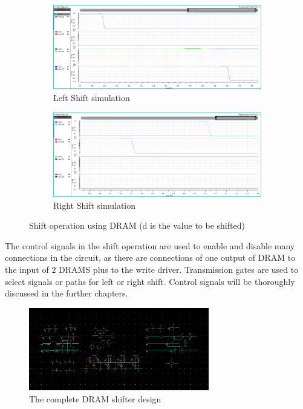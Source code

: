 \begin{figure}[H]
\begin{center}
\begin{subfigure}{0.7\textwidth}
\includegraphics[width=\textwidth]{shift_left_out.jpg}
\caption{Left Shift simulation}
\end{subfigure}
\begin{subfigure}{0.7\textwidth}
\includegraphics[width=\textwidth]{shift_out.jpg}
\caption{Right Shift simulation}
\end{subfigure}
\end{center}
\caption{Shift operation using DRAM (d is the value to be shifted)}

\end{figure}

The control signals in the shift operation are used to enable and disable many connections in the circuit, as there are connections of one output of DRAM to the input of 2 DRAMS plus to the write driver. Transmission gates are used to select signals or paths for left or right shift. Control signals will be thoroughly discussed in the further chapters.

\begin{figure}[H]
\centering
\includegraphics[width=0.7\textwidth]{shift_blk_full.png}
\caption{The complete DRAM shifter design}
\label{fig:Figure}
\end{figure}